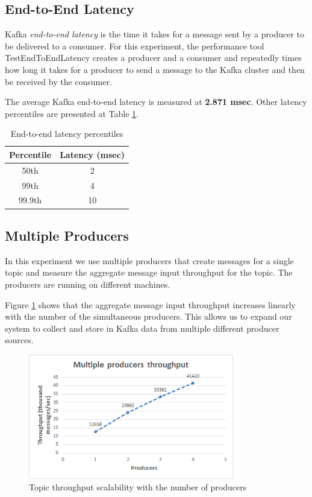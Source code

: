 \subsection{End-to-End Latency}

Kafka \emph{end-to-end latency} is the time it takes for a message sent by a producer to be delivered to a consumer. For this experiment, the performance tool TestEndToEndLatency creates a producer and a consumer and repeatedly times how long it takes for a producer to send a message to the Kafka cluster and then be received by the consumer. 

The average Kafka end-to-end latency is measured at \textbf{2.871 msec}. Other latency percentiles are presented at Table \ref{table:end-to-end_latency}.

\begin{table}[H]
\centering
\begin{tabular}{ |c|c| }
\hline
Percentile & Latency (msec) \\ \hline \hline
50th & 2 \\ \hline
99th & 4 \\ \hline
99.9th & 10 \\ \hline
\end{tabular}
\caption{End-to-end latency percentiles}
\label{table:end-to-end_latency}
\end{table}

\subsection{Multiple Producers}

In this experiment we use multiple producers that create messages for a single topic and measure the aggregate message input throughput for the topic. The producers are running on different machines.

Figure \ref{figure:benchmarks_kafka_producers} shows that the aggregate message input throughput increases linearly with the number of the simultaneous producers. This allows us to expand our system to collect and store in Kafka data from multiple different producer sources.

\begin{figure}[H]
\centering
\includegraphics[width=0.8\textwidth]{figures/benchmarks_kafka_producers}
\caption{Topic throughput scalability with the number of producers}
\label{figure:benchmarks_kafka_producers}
\end{figure}


